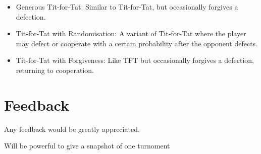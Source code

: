 \documentclass[11pt,preprint]{elsarticle}
\numberwithin{equation}{section}
\numberwithin{figure}{section}
\numberwithin{table}{section}
\begin{document}
\begin{itemize}
\item
  Generous Tit-for-Tat: Similar to Tit-for-Tat, but occasionally
  forgives a defection.
\item
  Tit-for-Tat with Randomisation: A variant of Tit-for-Tat where the
  player may defect or cooperate with a certain probability after the
  opponent defects.
\item
  Tit-for-Tat with Forgiveness: Like TFT but occasionally forgives a
  defection, returning to cooperation.
\end{itemize}

\section{Feedback}\label{feedback}

Any feedback would be greatly appreciated.

Will be powerful to give a snapshot of one turnoment

\newpage
\end{document}
